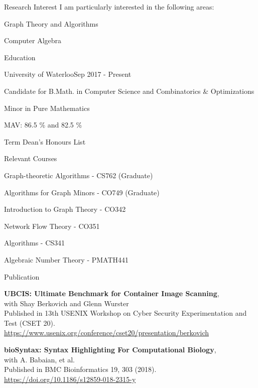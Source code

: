 \documentclass{cv}
\begin{document}
\begin{rSection}{Research Interest}
I am particularly interested in the following areas:
\begin{rSubsectionPure}
	\item Graph Theory and Algorithms
	\item Computer Algebra
\end{rSubsectionPure}
\end{rSection}

\begin{rSection}{Education}
\begin{rSubsection}{University of Waterloo}{Sep 2017 - Present}{}{}
	\item Candidate for B.Math. in Computer Science and Combinatorics \& Optimizations
	\item Minor in Pure Mathematics
	\item MAV: 86.5 \% and 82.5 \%
	\item Term Dean's Honours List
\end{rSubsection}

\begin{rSubsection}{Relevant Courses}{}{}{}
  \item Graph-theoretic Algorithms - CS762 (Graduate)
  \item Algorithms for Graph Minors - CO749 (Graduate)
  \item Introduction to Graph Theory - CO342
  \item Network Flow Theory - CO351
  \item Algorithms - CS341
  \item Algebraic Number Theory - PMATH441
\end{rSubsection}
\end{rSection}

\begin{rSection}{Publication}
\begin{rSubsectionPure}
	\item \textbf{{UBCIS}: Ultimate Benchmark for Container Image Scanning}, \\
	with Shay Berkovich and Glenn Wurster \\
	Published in 13th {USENIX} Workshop on Cyber Security Experimentation and Test ({CSET} 20). \\
	\href{https://www.usenix.org/conference/cset20/presentation/berkovich}{https://www.usenix.org/conference/cset20/presentation/berkovich}
\end{rSubsectionPure}

\begin{rSubsectionPure}
	\item \textbf{bioSyntax: Syntax Highlighting For Computational Biology}, \\
	with A. Babaian, et al. \\
	Published in BMC Bioinformatics 19, 303 (2018). \\
	\href{https://doi.org/10.1186/s12859-018-2315-y}{https://doi.org/10.1186/s12859-018-2315-y}
\end{rSubsectionPure}
\end{rSection}
\end{document}
